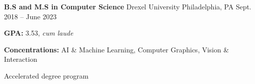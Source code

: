 

\begin{cventries}

  \cventry
  {\textbf{B.S and M.S in Computer Science}} %
  {Drexel University} %
  {Philadelphia, PA} %
  {Sept. 2018 -- June 2023} %
  {
    \begin{cvitems} %
      \item {\textbf{GPA:} 3.53, \textit{cum laude}}
      \item {\textbf{Concentrations:} AI \& Machine Learning, Computer Graphics, Vision \& Interaction}
      \item {Accelerated degree program}
    \end{cvitems}
  } 

\end{cventries}
